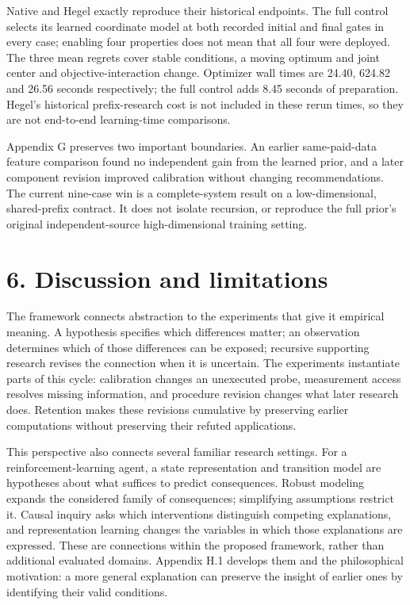 \documentclass[twoside,11pt]{article}
\begin{document}
Native and Hegel exactly reproduce their historical endpoints. The full control selects its learned coordinate model at both recorded initial and final gates in every case; enabling four properties does not mean that all four were deployed. The three mean regrets cover stable conditions, a moving optimum and joint center and objective-interaction change. Optimizer wall times are 24.40, 624.82 and 26.56 seconds respectively; the full control adds 8.45 seconds of preparation. Hegel's historical prefix-research cost is not included in these rerun times, so they are not end-to-end learning-time comparisons.


Appendix G preserves two important boundaries. An earlier same-paid-data feature comparison found no independent gain from the learned prior, and a later component revision improved calibration without changing recommendations. The current nine-case win is a complete-system result on a low-dimensional, shared-prefix contract. It does not isolate recursion, or reproduce the full prior's original independent-source high-dimensional training setting.


\section*{6. Discussion and limitations}

The framework connects abstraction to the experiments that give it empirical meaning. A hypothesis specifies which differences matter; an observation determines which of those differences can be exposed; recursive supporting research revises the connection when it is uncertain. The experiments instantiate parts of this cycle: calibration changes an unexecuted probe, measurement access resolves missing information, and procedure revision changes what later research does. Retention makes these revisions cumulative by preserving earlier computations without preserving their refuted applications.


This perspective also connects several familiar research settings. For a reinforcement-learning agent, a state representation and transition model are hypotheses about what suffices to predict consequences. Robust modeling expands the considered family of consequences; simplifying assumptions restrict it. Causal inquiry asks which interventions distinguish competing explanations, and representation learning changes the variables in which those explanations are expressed. These are connections within the proposed framework, rather than additional evaluated domains. Appendix H.1 develops them and the philosophical motivation: a more general explanation can preserve the insight of earlier ones by identifying their valid conditions.
\end{document}
